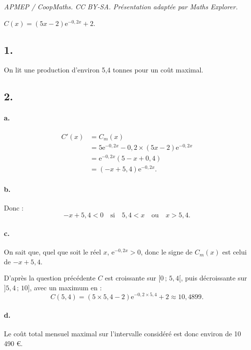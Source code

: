 \documentclass[10pt]{article}
\providecommand{\e}{{\mathrm{e}}}
\begin{document}
\noindent\textit{APMEP / CoopMaths. CC BY-SA. Présentation adaptée par Maths Explorer.}\par\medskip
\( C(x) = (5x - 2)\e^{-0{,}2x} + 2 \).

\subsection*{1.}

On lit une production d'environ 5{,}4 tonnes pour un coût maximal.

\subsection*{2.}

\paragraph{a.}
\begin{align*}
C'(x) &= C_m(x) \\
&= 5\e^{-0{,}2x} - 0{,}2 \times (5x - 2)\e^{-0{,}2x} \\
&= \e^{-0{,}2x}(5 - x + 0{,}4) \\
&= (-x + 5{,}4)\e^{-0{,}2x}.
\end{align*}

\paragraph{b.} Donc :
\[
-x + 5{,}4 < 0 \quad \text{si} \quad 5{,}4 < x \quad \text{ou} \quad x > 5{,}4.
\]

\paragraph{c.}

On sait que, quel que soit le réel \( x \), \( \e^{-0{,}2x} > 0 \), donc le signe de \( C_m(x) \) est celui de \( -x + 5{,}4 \).

D'après la question précédente \( C \) est croissante sur \( [0 \,;\, 5{,}4[ \), puis décroissante sur \( ]5{,}4 \,;\, 10] \), avec un maximum en :
\[
C(5{,}4) = (5 \times 5{,}4 - 2) \e^{-0{,}2 \times 5{,}4} + 2 \approx 10{,}4899.
\]

\begin{center}
\end{center}

\paragraph{d.}

Le coût total mensuel maximal sur l'intervalle considéré est donc environ de 10 490 €.
\end{document}
